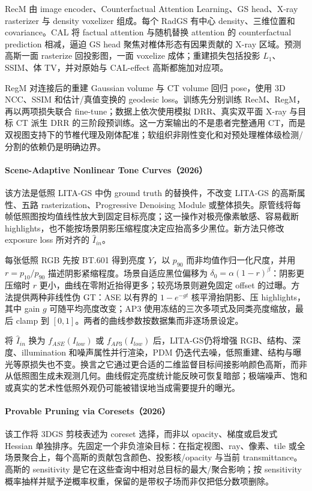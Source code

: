 RecM 由 image encoder、Counterfactual Attention Learning、GS head、X-ray rasterizer 与 density voxelizer 组成。每个 RadGS 有中心 density、三维位置和 covariance。CAL 将 factual attention 与随机替换 attention 的 counterfactual prediction 相减，逼迫 GS head 聚焦对椎体形态有因果贡献的 X-ray 区域。预测高斯一面 rasterize 回投影图，一面 voxelize 成体；重建损失包括投影 $L_1$、SSIM、体 TV，并对原始与 CAL-effect 高斯都施加对应项。

RegM 对连接后的重建 Gaussian volume 与 CT volume 回归 pose，使用 3D NCC、SSIM 和估计/真值变换的 geodesic loss。训练先分别训练 RecM、RegM，再以两项损失联合 fine-tune；数据上依次使用模拟 DRR、真实双平面 X-ray 与目标 CT 派生 DRR 的三阶段预训练。这一方案输出的不是患者完整通用 CT，而是双视图支持下的节椎代理及刚体配准；软组织非刚性变化和对预处理椎体级检测/分割的依赖仍是明确边界。

\paragraph{Scene-Adaptive Nonlinear Tone Curves（2026）\cite{2606_11841}}
该方法是低照 LITA-GS 中伪 ground truth 的替换件，不改变 LITA-GS 的高斯属性、五路 rasterization、Progressive Denoising Module 或整体损失。原管线将每帧低照图按均值线性放大到固定目标亮度；这一操作对极亮像素敏感、容易截断 highlights，也不能按场景阴影压缩程度决定应抬高多少黑位。新方法只修改 exposure loss 所对齐的 $\hat I_{in}$。

每张低照 RGB 先按 BT.601 得到亮度 $Y$，以 $p_{90}$ 而非均值作归一化尺度，并用 $r=p_{10}/p_{90}$ 描述阴影紧缩程度。场景自适应黑位偏移为 $\delta_0=\alpha(1-r)^\beta$：阴影更压缩时 $r$ 更小，曲线在零附近抬得更多；较亮场景则避免固定 offset 的过曝。方法提供两种非线性伪 GT：ASE 以有界的 $1-e^{-gt}$ 核平滑抬阴影、压 highlights，其中 gain $g$ 可随平均亮度改变；AP3 使用冻结的三次多项式及同类亮度缩放，最后 clamp 到 $[0,1]$。两者的曲线参数按数据集而非逐场景设定。

将 $\hat I_{in}$ 换为 $f_{ASE}(I_{low})$ 或 $f_{AP3}(I_{low})$ 后，LITA-GS仍将增强 RGB、结构、深度、illumination 和噪声属性并行渲染，PDM 仍迭代去噪，低照重建、结构与曝光等原损失也不变。换言之它通过更合适的二维监督目标间接影响颜色高斯，而非从低照图生成未观测几何。曲线假定亮度统计能反映可恢复暗部；极端噪声、饱和或真实的艺术性低照外观仍可能被错误地当成需要提升的曝光。

\paragraph{Provable Pruning via Coresets（2026）\cite{2607_02721}}
该工作将 3DGS 剪枝表述为 coreset 选择，而非以 opacity、梯度或启发式 Hessian 单独排序。先固定一个非负渲染目标：在指定视图、ray、像素、tile 或全场景聚合上，每个高斯的贡献包含颜色、投影核/opacity 与当前 transmittance。高斯的 sensitivity 是它在这些查询中相对总目标的最大/聚合影响；按 sensitivity 概率抽样并赋予逆概率权重，保留的是带权子场而非仅把低分数项删除。

